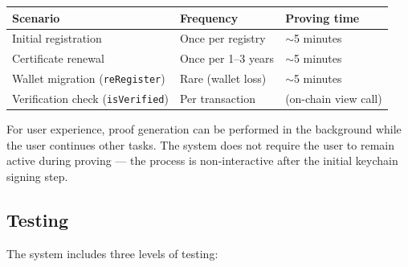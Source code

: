 \documentclass[11pt, a4paper]{article}
\begin{document}
\begin{longtable}[]{@{}
  >{\raggedright\arraybackslash}p{}
  >{\raggedright\arraybackslash}p{}
  >{\raggedright\arraybackslash}p{}@{}}
\toprule\noalign{}
\begin{minipage}[b]{\linewidth}\raggedright
Scenario
\end{minipage} & \begin{minipage}[b]{\linewidth}\raggedright
Frequency
\end{minipage} & \begin{minipage}[b]{\linewidth}\raggedright
Proving time
\end{minipage} \\
\midrule\noalign{}
\endhead
\bottomrule\noalign{}
\endlastfoot
Initial registration & Once per registry & $\sim$5 minutes \\
Certificate renewal & Once per 1--3 years & $\sim$5 minutes \\
Wallet migration (\texttt{reRegister}) & Rare (wallet loss) &
$\sim$5 minutes \\
Verification check (\texttt{isVerified}) & Per transaction & 0 (on-chain
view call) \\
\end{longtable}

For user experience, proof generation can be performed in the background
while the user continues other tasks. The system does not require the
user to remain active during proving --- the process is non-interactive
after the initial keychain signing step.

\subsection{Testing}\label{testing}

The system includes three levels of testing:
\end{document}
